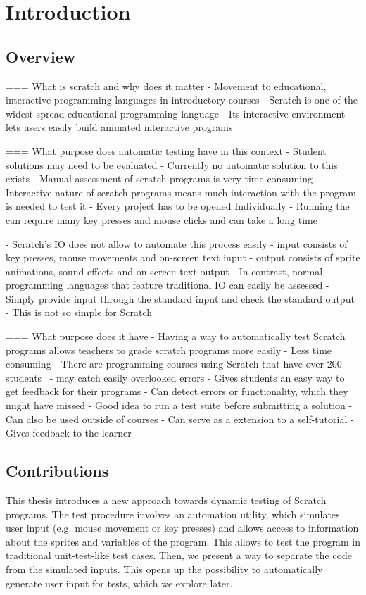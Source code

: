 
\chapter{Introduction}

\section{Overview}
=== What is scratch and why does it matter
- Movement to educational, interactive programming languages in introductory courses
- Scratch is one of the widest spread educational programming language
- Its interactive environment lets users easily build animated interactive programs

=== What purpose does automatic testing have in this context
- Student solutions may need to be evaluated
- Currently no automatic solution to this exists
- Manual assessment of scratch programs is very time consuming
- Interactive nature of scratch programs means much interaction with the program is needed to test it
- Every project has to be opened Individually
- Running the can require many key presses and mouse clicks and can take a long time

- Scratch's IO does not allow to automate this process easily
    - input consists of key presses, mouse movements and on-screen text input
    - output consists of sprite animations, sound effects and on-screen text output
- In contrast, normal programming languages that feature traditional IO can easily be assessed
- Simply provide input through the standard input and check the standard output
- This is not so simple for Scratch

=== What purpose does it have
- Having a way to automatically test Scratch programs allows teachers to grade scratch programs more easily
    - Less time consuming
        - There are programming courses using Scratch that have over 200 students~\cite{itch}
    - may catch easily overlooked errors
    - Gives students an easy way to get feedback for their programs
        - Can detect errors or functionality, which they might have missed
        - Good idea to run a test suite before submitting a solution
- Can also be used outside of courses
    - Can serve as a extension to a self-tutorial
    - Gives feedback to the learner

\section{Contributions}
This thesis introduces a new approach towards dynamic testing of Scratch programs.
The test procedure involves an automation utility, which simulates user input (e.g. mouse movement or key presses) and allows access to information about the sprites and variables of the program.
This allows to test the program in traditional unit-test-like test cases.
Then, we present a way to separate the code from the simulated inputs.
This opens up the possibility to automatically generate user input for tests, which we explore later.


